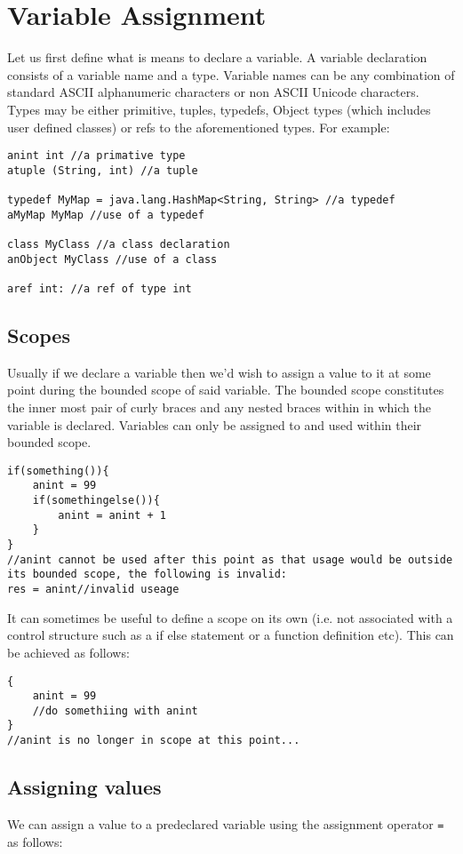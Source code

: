 \documentclass[conc-doc]{subfiles}
\begin{document}
	\chapter[Variable Assignment]{Variable Assignment}
	\label{ch:assignment}
Let us first define what is means to declare a variable. A variable declaration consists of a variable name and a type. Variable names can be any combination of standard ASCII alphanumeric characters or non ASCII Unicode characters. Types may be either primitive, tuples, typedefs, Object types (which includes user defined classes) or refs to the aforementioned types. For example:
\begin{lstlisting}
anint int //a primative type
atuple (String, int) //a tuple

typedef MyMap = java.lang.HashMap<String, String> //a typedef
aMyMap MyMap //use of a typedef

class MyClass //a class declaration
anObject MyClass //use of a class

aref int: //a ref of type int
\end{lstlisting}

\section{Scopes}
Usually if we declare a variable then we'd wish to assign a value to it at some point during the bounded scope of said variable. The bounded scope constitutes the inner most pair of curly braces and any nested braces within in which the variable is declared. Variables can only be assigned to and used within their bounded scope.

\begin{lstlisting}
if(something()){
	anint = 99
	if(somethingelse()){
		anint = anint + 1
	}
}
//anint cannot be used after this point as that usage would be outside its bounded scope, the following is invalid:
res = anint//invalid useage
\end{lstlisting}

It can sometimes be useful to define a scope on its own (i.e. not associated with a control structure such as a if else statement or a function definition etc). This can be achieved as follows:

\begin{lstlisting}
{
	anint = 99
	//do somethiing with anint
}
//anint is no longer in scope at this point...
\end{lstlisting}

\section{Assigning values}
We can assign a value to a predeclared variable using the assignment operator \lstinline{=} as follows:
\end{document}
